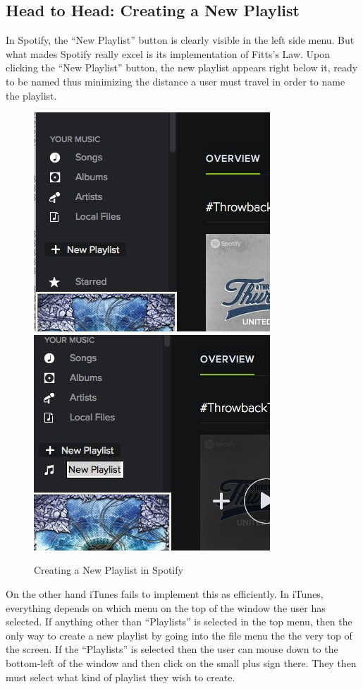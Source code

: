 \documentclass[a4paper]{article}
\begin{document}
\subsection{Head to Head: Creating a New Playlist}
In Spotify, the ``New Playlist'' button is clearly visible in the left side menu. But what mades Spotify really excel is its implementation of Fitts's Law. Upon clicking the ``New Playlist'' button, the new playlist appears right below it, ready to be named thus minimizing the distance a user must travel in order to name the playlist.
\begin{figure}[H]
\centering
\includegraphics[width=.3\textwidth]{spotifyplaylist1_copy.jpg}
\includegraphics[width=.3\textwidth]{spotifyplaylist2_copy.jpg}
\caption{\label{heuristic: playlistSpotify} Creating a New Playlist in Spotify}
\end{figure}
On the other hand iTunes fails to implement this as efficiently. In iTunes, everything depends on which menu on the top of the window the user has selected. If anything other than ``Playlists'' is selected in the top menu, then the only way to create a new playlist by going into the file menu the the very top of the screen. If the ``Playlists'' is selected then the user can mouse down to the bottom-left of the window and then click on the small plus sign there. They then must select what kind of playlist they wish to create.
\end{document}
